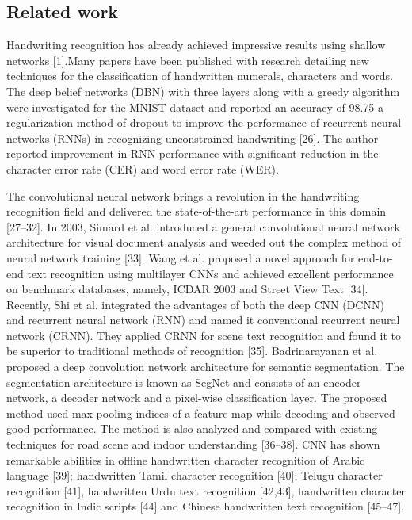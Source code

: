 


\subsection{Related work}
Handwriting recognition has already achieved impressive results using shallow networks [1].Many
papers have been published with research detailing new techniques for the classification of handwritten
numerals, characters and words. The deep belief networks (DBN) with three layers along with a greedy
algorithm were investigated for the MNIST dataset and reported an accuracy of 98.75%
a regularization method of dropout to improve the performance of recurrent neural networks (RNNs) in
recognizing unconstrained handwriting [26].
The author reported improvement in RNN performance with significant reduction in the character error rate (CER) and word error rate (WER).\par 
\vspace{5mm}
The convolutional neural network brings a revolution in the handwriting recognition field and delivered
the state-of-the-art performance in this domain [27–32]. In 2003, Simard et al. introduced a general
convolutional neural network architecture for visual document analysis and weeded out the complex method of neural network training [33]. Wang et al. proposed a novel approach for end-to-end text recognition using multilayer CNNs and achieved excellent performance on benchmark databases, namely, ICDAR 2003 and Street View Text [34]. Recently, Shi et al. integrated the advantages of both the deep CNN (DCNN) and recurrent neural network (RNN) and named it conventional recurrent neural network (CRNN). They applied CRNN for scene text recognition and found it to be superior to traditional methods of recognition [35]. Badrinarayanan et al. proposed a deep convolution network architecture for semantic segmentation. The segmentation architecture is known as SegNet and consists of an encoder network, a decoder network and a pixel-wise classification layer. The proposed method used max-pooling indices of a feature map while decoding and observed good performance. The method is also analyzed and compared with existing techniques for road scene and indoor understanding [36–38]. CNN has shown remarkable abilities in offline handwritten character recognition of Arabic language [39]; handwritten Tamil character recognition [40]; Telugu character recognition [41], handwritten Urdu text recognition [42,43], handwritten character recognition in Indic scripts [44] and Chinese handwritten text recognition [45–47].\par 
